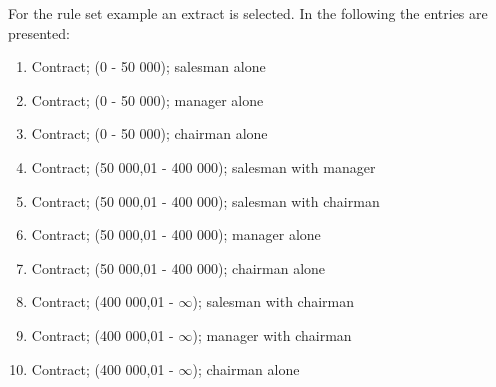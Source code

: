 For the rule set example an extract is selected. In the following the entries are presented:
\begin{enumerate}
	\item Contract; (0 - 50 000); salesman alone
	\item Contract; (0 - 50 000); manager alone
	\item Contract; (0 - 50 000); chairman alone
	\item Contract; (50 000,01 - 400 000); salesman with manager
	\item Contract; (50 000,01 - 400 000); salesman with chairman
	\item Contract; (50 000,01 - 400 000); manager alone
	\item Contract; (50 000,01 - 400 000); chairman alone
	\item Contract; (400 000,01 - $\infty$); salesman with chairman
	\item Contract; (400 000,01 - $\infty$); manager with chairman
	\item Contract; (400 000,01 - $\infty$); chairman alone
\end{enumerate}